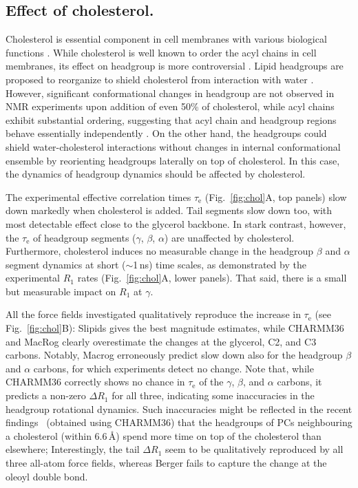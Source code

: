 \documentclass[journal=jcisd8,manuscript=article,layout=twocolumn]{achemso}
\begin{document}
\subsection*{Effect of cholesterol.}
Cholesterol is essential component in cell membranes with various biological functions \cite{??}.
While cholesterol is well known to order the acyl chains in cell membranes,
its effect on headgroup is more controversial \cite{??}. Lipid headgroups are proposed
to reorganize to shield cholesterol from interaction with water \cite{??}. However,
significant conformational changes in headgroup are not observed in NMR experiments upon addition
of even 50\% of cholesterol, while acyl chains exhibit substantial ordering,
suggesting that acyl chain and headgroup regions behave essentially independently \cite{ferreira13,botan15}.
On the other hand, the headgroups could shield water-cholesterol interactions
without changes in internal conformational ensemble by reorienting headgroups laterally on
top of cholesterol. In this case, the dynamics of headgroup dynamics should be affected by cholesterol. 

The experimental effective correlation times $\tau_\mathrm e$
(Fig.~\ref{fig:chol}A, top panels)
slow down markedly when cholesterol is added. Tail segments slow down too, with most detectable effect close to the glycerol backbone.
%
In stark contrast, however,
the $\tau_\mathrm e$ of headgroup segments ($\gamma$, $\beta$, $\alpha$)
are unaffected by cholesterol. 
%
Furthermore, cholesterol induces no measurable change in the
headgroup $\beta$ and $\alpha$ segment
dynamics at short ($\sim$1\,ns) time scales, as
demonstrated by
the experimental $R_{1}$ rates (Fig.~\ref{fig:chol}A, lower panels).
That said,
there is a small but measurable impact on $R_1$ at $\gamma$.

All the force fields investigated qualitatively reproduce the increase in $\tau_\mathrm e$ (see Fig.~\ref{fig:chol}B):
Slipids gives the best magnitude estimates, while CHARMM36 and MacRog clearly overestimate the changes at the glycerol, C2, and C3 carbons. Notably, Macrog erroneously predict slow down also for the headgroup $\beta$ and $\alpha$ carbons, for which experiments detect no change. 
%
Note that,  while CHARMM36 correctly shows no chance in $\tau_\mathrm{e}$
of the $\gamma$, $\beta$, and $\alpha$ carbons,
it predicts a non-zero $\Delta R_{1}$ for all three, indicating some inaccuracies in the
headgroup rotational dynamics. %
Such inaccuracies might be reflected in the recent findings~\cite{leeb18}
(obtained using CHARMM36)
that 
the headgroups of PCs neighbouring a cholesterol (within 6.6\,\AA) spend more time on top of the cholesterol than elsewhere;
%
Interestingly, 
the tail $\Delta R_{1}$ seem to be qualitatively reproduced by
all three all-atom force fields, whereas Berger fails to capture the change at the oleoyl double bond.
\end{document}
